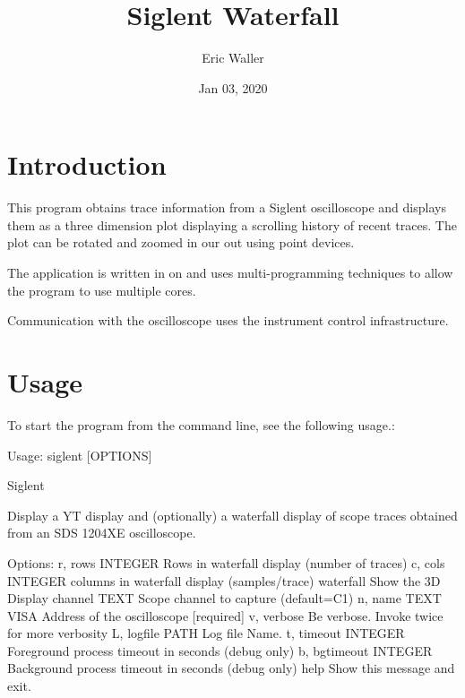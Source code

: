 \documentclass[letterpaper,10pt,english]{sphinxmanual}
\title{Siglent Waterfall}
\date{Jan 03, 2020}
\author{Eric Waller}
\begin{document}
\pagestyle{empty}
\sphinxmaketitle
\pagestyle{plain}
\sphinxtableofcontents
\pagestyle{normal}
\label{\detokenize{index::doc}}



\chapter{Introduction}
\label{\detokenize{index:introduction}}
This program obtains trace information from a Siglent oscilloscope and
displays them as a three dimension plot displaying a scrolling history
of recent traces.  The plot can be rotated and zoomed in our out
using point devices.

The application is written in  on and uses multi-programming
techniques to allow the program to use multiple cores.

Communication with the oscilloscope uses the  instrument control
infrastructure.


\chapter{Usage}
\label{\detokenize{index:usage}}
To start the program from the command line, see the following usage.:

\begin{sphinxVerbatim}[commandchars=\\\{\}]
Usage: siglent [OPTIONS]

  Siglent

  Display a YT display and (optionally) a waterfall display of scope traces
  obtained from an SDS 1204X\PYGZhy{}E oscilloscope.

Options:
  \PYGZhy{}r, \PYGZhy{}\PYGZhy{}rows INTEGER       Rows in waterfall display (number of traces)
  \PYGZhy{}c, \PYGZhy{}\PYGZhy{}cols INTEGER       columns in waterfall display (samples/trace)
  \PYGZhy{}\PYGZhy{}waterfall              Show the 3D Display
  \PYGZhy{}\PYGZhy{}channel TEXT           Scope channel to capture (default=C1)
  \PYGZhy{}n, \PYGZhy{}\PYGZhy{}name TEXT          VISA Address of the oscilloscope  [required]
  \PYGZhy{}v, \PYGZhy{}\PYGZhy{}verbose            Be verbose.  Invoke twice for more verbosity
  \PYGZhy{}L, \PYGZhy{}\PYGZhy{}log\PYGZhy{}file PATH      Log file Name.
  \PYGZhy{}t, \PYGZhy{}\PYGZhy{}timeout INTEGER    Foreground process timeout in seconds (debug only)
  \PYGZhy{}b, \PYGZhy{}\PYGZhy{}bgtimeout INTEGER  Background process timeout in seconds (debug only)
  \PYGZhy{}\PYGZhy{}help                   Show this message and exit.
\end{sphinxVerbatim}
\end{document}

